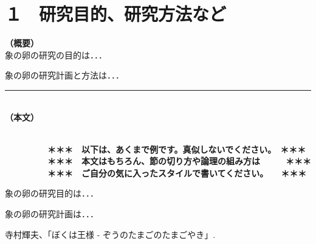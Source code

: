 
\section{１　研究目的、研究方法など}

\noindent
\textbf{（概要）}\\
	象の卵の研究の目的は．．．	

	象の卵の研究計画と方法は．．．
	\vspace*{10zw}	%

\noindent
\rule{\linewidth}{1pt}\\
\noindent
\textbf{（本文）}
\JSPSInstructions	%

\textbf{\\　　　　　＊＊＊　以下は、あくまで例です。真似しないでください。　＊＊＊\\
　　　　　＊＊＊　本文はもちろん、節の切り方や論理の組み方は　　　＊＊＊\\
　　　　　＊＊＊　ご自分の気に入ったスタイルで書いてください。　　＊＊＊}

	 象の卵の研究目的は．．．

	象の卵の研究計画は．．．

	\vspace{1cm}
	\begin{thebibliography}{99}
		 寺村輝夫、「ぼくは王様 - ぞうのたまごのたまごやき」.
	\end{thebibliography}




